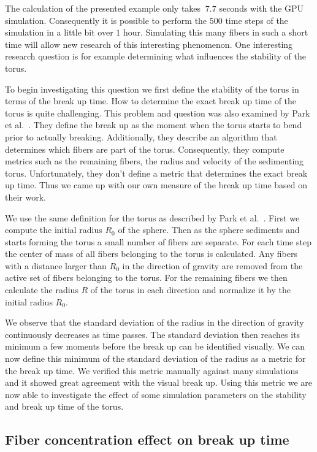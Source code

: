 The calculation of the presented example only takes $~7.7$ seconds with the GPU simulation. Consequently it is possible to perform the $500$ time steps of the simulation in a little bit over $1$ hour. Simulating this many fibers in such a short time will allow new research of this interesting phenomenon. One interesting research question is for example determining what influences the stability of the torus.

To begin investigating this question we first define the stability of the torus in terms of the break up time. How to determine the exact break up time of the torus is quite challenging. This problem and question was also examined by Park et al.~\cite{Park2010}. They define the break up as the moment when the torus starts to bend prior to actually breaking. Additionally, they describe an algorithm that determines which fibers are part of the torus. Consequently, they compute metrics such as the remaining fibers, the radius and velocity of the sedimenting torus. Unfortunately, they don't define a metric that determines the exact break up time. Thus we came up with our own measure of the break up time based on their work.

We use the same definition for the torus as described by Park et al.~\cite{Park2010}. First we compute the initial radius $R_0$ of the sphere. Then as the sphere sediments and starts forming the torus a small number of fibers are separate. For each time step the center of mass of all fibers belonging to the torus is calculated. Any fibers with a distance larger than $R_0$ in the direction of gravity are removed from the active set of fibers belonging to the torus. For the remaining fibers we then calculate the radius $R$ of the torus in each direction and normalize it by the initial radius $R_0$.

We observe that the standard deviation of the radius in the direction of gravity continuously decreases as time passes. The standard deviation then reaches its minimum a few moments before the break up can be identified visually. We can now define this minimum of the standard deviation of the radius as a metric for the break up time. We verified this metric manually against many simulations and it showed great agreement with the visual break up. Using this metric we are now able to investigate the effect of some simulation parameters on the stability and break up time of the torus.

\subsection{Fiber concentration effect on break up time}

